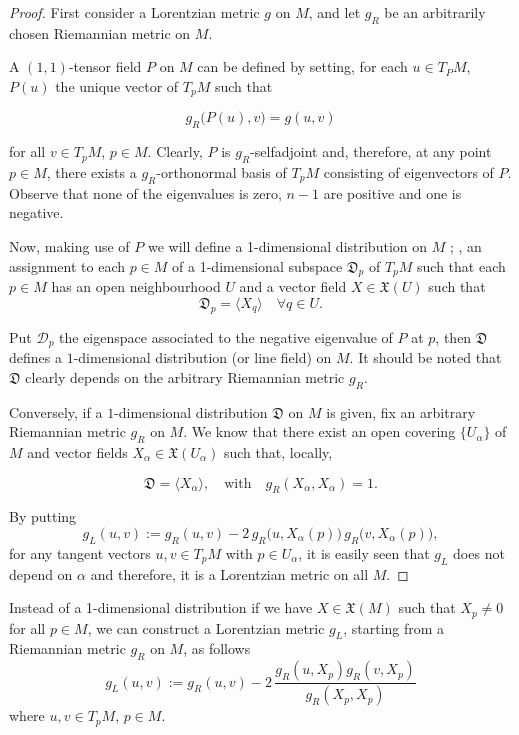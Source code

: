 \begin{proof}
    First consider a Lorentzian metric $g$ on $M$, and let $g_R$ be an arbitrarily chosen Riemannian metric on $M$.

    A $(1,1)$-tensor field $P$ on $M$ can be defined by setting, for each $u \in T_PM$, $P(u)$ the unique vector of $T_pM$ such that

    \[
    g_R\big(P(u),v\big)=g(u,v)
    \]

    for all $v \in T_pM$, $p \in M$. Clearly, $P$ is $g_R$-selfadjoint and, therefore, at any point $p \in M$, there exists a $g_R$-orthonormal basis of $T_pM$ consisting of eigenvectors of $P$. Observe that none of the eigenvalues is zero, $n-1$ are positive and one is negative.
    
    Now, making use of $P$ we will define a 1-dimensional distribution on $M$ \cite{kobnom63}; \ie, an assignment to each $p \in M$ of a 1-dimensional subspace $\mathfrak{D}_p$ of $T_p M$ such that each $p\in M$ has an open neighbourhood $U$ and a vector field $X \in \mathfrak{X}(U)$ such that 
    \[
		\mathfrak{D}_p = \langle X_q \rangle \quad \forall q \in U.
    \]
    
    Put $\mathcal{D}_p$ the eigenspace associated to the negative eigenvalue of $P$ at $p$, then $\mathfrak{D}$ defines a $1$-dimensional distribution (or line field) on $M$. It should be noted that $\mathfrak{D}$ clearly depends on the arbitrary Riemannian metric $g_R$.

    Conversely, if a $1$-dimensional distribution $\mathfrak{D}$ on $M$ is given, fix an arbitrary Riemannian metric $g_R$ on $M$. We know that there exist an open covering $\{U_{\alpha}\}$ of $M$ and vector fields $X_\alpha \in \mathfrak{X}(U_\alpha)$ such that, locally,

    \[
    \mathfrak{D}=\langle X_{\alpha} \rangle, \quad \mathrm{with} \quad
    g_R(X_{\alpha},X_{\alpha})=1.
    \]

    By putting
    \[
        g_{L}(u,v):=g_{R}(u,v)-2\,g_{R}\big(u,X_{\alpha}(p)\big)\,g_{R}\big(v,X_{\alpha}(p)\big),
    \]
    for any tangent vectors $u,v \in T_{p}M$ with $p\in U_\alpha$, it is easily seen that $g_{L}$ does not depend on $\alpha$ and therefore, it is a Lorentzian metric on all $M$.
\end{proof}


\begin{remark}
    Instead of a 1-dimensional distribution if we have $X \in \mathfrak{X}(M)$ such that $X_p \neq 0$ for all $p \in M$, we can construct a Lorentzian metric $g_L$, starting from a Riemannian metric $g_R$ on $M$, as follows
    \[
        g_{L}(u,v):=g_{R}(u,v)-2\,\frac{g_R(u,X_p)g_R(v,X_p)}{g_R(X_p,X_p)}
    \]
    where $u,v \in T_{p}M$, $p\in M$.
\end{remark}

